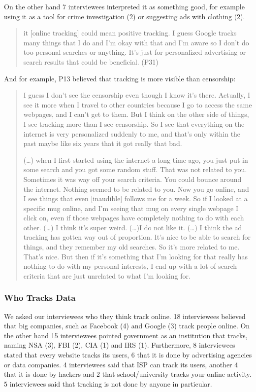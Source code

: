 On the other hand 7 interviewees interpreted it as something good, for example using it as a tool for crime investigation (2) or suggesting ads with clothing (2). 

\begin{quote} it [online tracking] could mean positive tracking. I guess Google tracks many things that I do and I'm okay with that and I'm aware so I don't do too personal searches or anything. It's just for personalized advertising or search results that could be beneficial. (P31) \end{quote}

And for example, P13 believed that tracking is more visible than censorship:

\begin{quote}I guess I don't see the censorship even though I know it's there. Actually, I see it more when I travel to other countries because I go to access the same webpages, and I can't get to them. But I think on the other side of things, I see tracking more than I see censorship. So I see that everything on the internet is very personalized suddenly to me, and that's only within the past maybe like six years that it got really that bad.


(\dots) when I first started using the internet a long time ago, you just put in some search and you got some random stuff. That was not related to you. Sometimes it was way off your search criteria. You could bounce around the internet. Nothing seemed to be related to you. Now you go online, and I see things that even [inaudible] follows me for a week. So if I looked at a specific mug online, and I'm seeing that mug on every single webpage I click on, even if those webpages have completely nothing to do with each other. (\dots) I think it's super weird. (\dots)I do not like it. (\dots) I think the ad tracking has gotten way out of proportion. It's nice to be able to search for things, and they remember my old searches. So it's more related to me. That's nice. But then if it's something that I'm looking for that really has nothing to do with my personal interests, I end up with a lot of search criteria that are just unrelated to what I'm looking for.\end{quote} 



\subsubsection{Who Tracks Data}
We asked our interviewees who they think track online. 18 interviewees believed that big companies, such as Facebook (4) and Google (3) track people online. On the other hand 15 interviewees pointed government as an institution that tracks, naming NSA (3), FBI (2), CIA (1) and IRS (1). Furthermore, 8 interviewees stated that every website tracks its users, 6 that it is done by advertising agencies or data companies. 4 interviewees said that ISP can track its users, another 4 that it is done by hackers and 2 that school/university tracks your online activity. 5 interviewees said that tracking is not done by anyone in particular.

